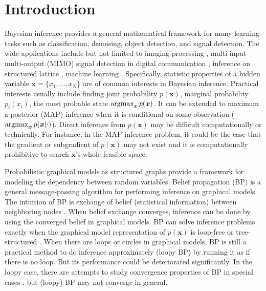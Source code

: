 \documentclass[conference,onecolumn]{IEEEtran}
\begin{document}
\section{Introduction}\label{sec:introduction}
Bayesian inference provides a general mathematical framework for many learning tasks such as classification, denoising, object detection, and signal detection. The wide applications include but not limited to imaging processing \cite{zhang2013denoise}, multi-input-multi-output (MIMO) signal detection in digital communication \cite{cespedes2014ep,jeon2015optimality}, inference on structured lattice \cite{10.2307/25651244}, machine learning  \cite{2018arXiv180607066M, Lin:2015:DLM:2969239.2969280, yoon2019inferenceGraph}.
Specifically, statistic properties of a hidden variable $\bm{x} = \{x_1,\dots,x_N\}$ are of common interests in Bayesian inference. Practical interests usually include finding joint probability $p(\bm{x})$, marginal probability $p_i(x_i)$, the most probable state $\operatorname{argmax}_{\bm{x}} p(\bm{x})$. It can be extended to maximum a posterior (MAP) inference when it is conditional on some observation ($\operatorname{argmax}_{\bm{x}}p(\bm{x} | \cdot)$). Direct inference from $p(\bm{x})$ may be difficult computationally or technically. For instance, in the MAP inference problem, it could be the case that the gradient or subgradient of $p(\bm{x})$ may not exist and it is computationally prohibitive to search $\bm{x}$'s whole feasible space.


Probabilistic graphical models as structured graphs provide a framework for modeling the dependency between random variables. Belief propagation (BP) is a general message-passing algorithm for performing inference on graphical models. The intuition of BP is exchange of belief (statistical information) between neighboring nodes \cite{Bishop:2006:PRM:1162264}. When belief exchange converges, inference can be done by using the converged belief in graphical models. BP can solve inference problems exactly when the graphical model representation of $p(\bm{x})$ is loop-free or tree-structured \cite{kschischang2001factor_graph}.
When there are loops or circles in graphical models, BP is still a practical method to do inference approximately (loopy BP) by running it as if there is no loop. But its performance could be deteriorated significantly. In the loopy case,
there are attempts to study convergence properties of BP in special cases \cite{Ihler:2005:LBP:1046920.1088703, du2017convergenceBP}, but (loopy) BP may not converge in general.
\end{document}
